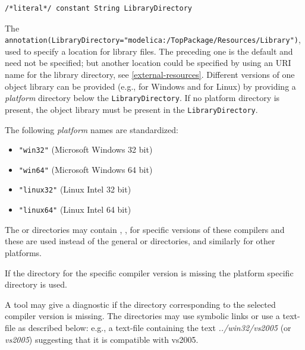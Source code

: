\begin{annotationdefinition}[LibraryDirectory]
\begin{synopsis}\begin{lstlisting}
/*literal*/ constant String LibraryDirectory
\end{lstlisting}\end{synopsis}
\begin{semantics}
The {\lstinline!annotation(LibraryDirectory="modelica:/TopPackage/Resources/Library")!}, used to specify a location for library files.
The preceding one is the default and need not be specified; but another location could be specified by using an URI name for the library directory, see \cref{external-resources}.
Different versions of one object library can be provided (e.g., for Windows and for Linux) by providing a \emph{platform} directory below the {\lstinline!LibraryDirectory!}.
If no platform directory is present, the object library must be present in the {\lstinline!LibraryDirectory!}.

The following \emph{platform} names are standardized:
\begin{itemize}
\item
  {\lstinline!"win32"!} (Microsoft Windows 32 bit)
\item
  {\lstinline!"win64"!} (Microsoft Windows 64 bit)
\item
  {\lstinline!"linux32"!} (Linux Intel 32 bit)
\item
  {\lstinline!"linux64"!} (Linux Intel 64 bit)
\end{itemize}

The  or  directories may contain , ,  for specific versions of these compilers and these are used instead of the general  or  directories, and similarly for other platforms.

If the directory for the specific compiler version is missing the platform specific directory is used.

\begin{nonnormative}
A tool may give a diagnostic if the directory corresponding to the selected compiler version is missing.
The directories may use symbolic links or use a text-file as described below: e.g., a text-file  containing the text \emph{../win32/vs2005} (or \emph{vs2005}) suggesting that it is compatible with vs2005.
\end{nonnormative}
\end{semantics}
\end{annotationdefinition}

